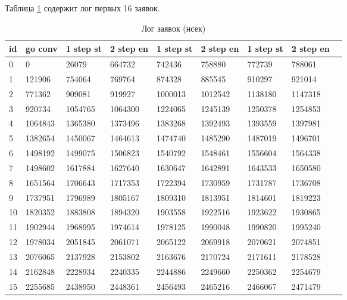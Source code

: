 Таблица \ref{tab:resulttime} содержит лог первых 16 заявок.

\begin{table}[ht]
    \caption{Лог заявок (нсек)}
    \centering
\begin{tabular}{ l | l | l | l | l | l | l | l | l }

 id &   go conv &1 step st & 2 step en &1 step st & 2 step en &1 step st & 2 step en \\ \hline
 0 &         0 &    26079 &    664732 &   742436 &    758880 &   772739 &    788061 \\ 
 1 &    121906 &   754064 &    769764 &   874328 &    885545 &   910297 &    921014 \\
 2 &    771362 &   909081 &    919927 &  1000013 &   1012542 &  1138180 &   1147318 \\
 3 &    920734 &  1054765 &   1064300 &  1224065 &   1245139 &  1250378 &   1254853 \\
 4 &   1064843 &  1365380 &   1373496 &  1383268 &   1392493 &  1393559 &   1397981 \\
 5 &   1382654 &  1450067 &   1464613 &  1474740 &   1485290 &  1487019 &   1496701 \\
 6 &   1498192 &  1499075 &   1506823 &  1540792 &   1548461 &  1556604 &   1564338 \\
 7 &   1498602 &  1617884 &   1627640 &  1630647 &   1642891 &  1643533 &   1650580 \\
 8 &   1651564 &  1706643 &   1717353 &  1722394 &   1730959 &  1731787 &   1736708 \\
 9 &   1737951 &  1796989 &   1805167 &  1809310 &   1813951 &  1814601 &   1819223 \\
10 &   1820352 &  1883808 &   1894320 &  1903558 &   1922516 &  1923622 &   1930865 \\
11 &   1902944 &  1968995 &   1974614 &  1978125 &   1990048 &  1990820 &   1995240 \\
12 &   1978034 &  2051845 &   2061071 &  2065122 &   2069918 &  2070621 &   2074851 \\
13 &   2076065 &  2137928 &   2153802 &  2163676 &   2170724 &  2171611 &   2178528 \\
14 &   2162848 &  2228934 &   2240335 &  2244886 &   2249660 &  2250362 &   2254679 \\
15 &   2255685 &  2438950 &   2448361 &  2456493 &   2465216 &  2466067 &   2471479 \\

\end{tabular}
\label{tab:resulttime}
\end{table}

